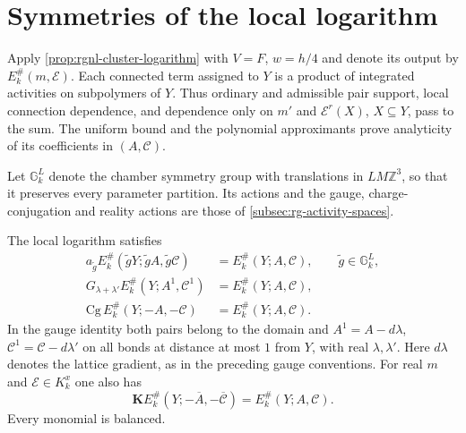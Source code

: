 \documentclass[11pt,letterpaper,reqno]{amsart}
\newcommand{\Z}{\mathbb Z}
\begin{document}
\section{Symmetries of the local logarithm}
\label{subsec:rgnl-symmetries}

Apply \cref{prop:rgnl-cluster-logarithm} with
$V=F$, $w=h/4$ and denote its output by
$E_k^\#(m,\mathscr E)$. Each connected term assigned to
$Y$ is a product of integrated activities on subpolymers
of $Y$. Thus ordinary and admissible pair support, local
connection dependence, and dependence only on $m'$ and
$\mathscr E^r(X)$, $X\subseteq Y$, pass to the sum.
The uniform bound and the polynomial approximants prove
analyticity of its coefficients in $(A,\mathscr C)$.

Let $\mathbb G_k^L$ denote the chamber symmetry group with
translations in $LM\Z^3$, so that it preserves every
parameter partition. Its actions and the gauge,
charge-conjugation and reality actions are those of
\cref{subsec:rg-activity-spaces}.

\begin{proposition}\label{prop:rgnl-symmetries}
The local logarithm satisfies
\begin{align}
 a_{\tilde g}E_k^\#(\tilde gY;\tilde gA,\tilde g\mathscr C)
          &=E_k^\#(Y;A,\mathscr C),\qquad \tilde g\in\mathbb G_k^L,
                                      \label{eq:rgnl-lattice-symmetry}\\
 G_{\lambda+\lambda'}E_k^\#(Y;A^1,\mathscr C^1)
          &=E_k^\#(Y;A,\mathscr C),    \label{eq:rgnl-gauge-symmetry}\\
 \mathrm{Cg}\,E_k^\#(Y;-A,-\mathscr C)
          &=E_k^\#(Y;A,\mathscr C).    \label{eq:rgnl-charge-symmetry}
\end{align}
In the gauge identity both pairs belong to the domain and
 $A^1=A-d\lambda$, $\mathscr C^1=\mathscr C-d\lambda'$
on all bonds at distance at most $1$ from $Y$, with
real $\lambda,\lambda'$. Here $d\lambda$ denotes the
lattice gradient, as in the preceding gauge conventions.
For real $m$ and $\mathscr E\in K_k^x$ one also has
\begin{equation}\label{eq:rgnl-reality-symmetry}
 \mathbf K E_k^\#(Y;-\overline A,-\overline{\mathscr C})
                                        =E_k^\#(Y;A,\mathscr C).
\end{equation}
Every monomial is balanced.
\end{proposition}
\end{document}
